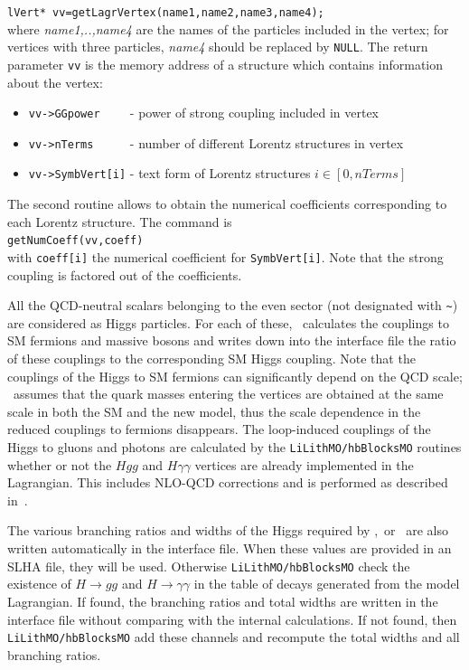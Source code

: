 \documentclass[12pt,a4paper]{article}
\begin{document}
\verb|lVert* vv=getLagrVertex(name1,name2,name3,name4);|\\

\noindent
where {\it name1,..,name4 } are the names of the particles included  in the vertex; for vertices with three particles, {\it name4} should be replaced by
{\tt NULL}.  The return parameter {\tt vv} is the memory address of a structure which contains information about the vertex:
\begin{itemize}
\item \verb|vv->GGpower    | - power of strong coupling included in vertex
\item \verb|vv->nTerms     | - number of different  Lorentz structures in vertex
\item \verb|vv->SymbVert[i]| - text form of Lorentz structures $i\in [0,nTerms]$  
\end{itemize}
The second routine allows to obtain the numerical coefficients corresponding to  each  Lorentz structure. The command is\\

\verb|getNumCoeff(vv,coeff)| \\

\noindent
with {\tt coeff[i]} the numerical coefficient for {\tt SymbVert[i]}. Note that the strong coupling is factored out of the coefficients. 

 
All the QCD-neutral scalars belonging to the even sector (not designated with \verb|~|)  are considered as  Higgs particles. For each of these, \micro\ calculates  the couplings to  SM fermions and massive  bosons and  writes down into the interface file the ratio of these couplings to the  corresponding  SM Higgs coupling. Note that the  couplings of the Higgs to   SM  fermions can significantly depend on the QCD scale; \micro\ assumes that the quark masses entering the vertices are obtained at the same scale in both  the
SM and  the new model, thus the scale dependence in the  reduced couplings to fermions disappears. 
The loop-induced  couplings of the Higgs to  gluons and photons are calculated by the {\tt LiLithMO/hbBlocksMO}  routines whether or not the $Hgg$ and $H\gamma\gamma$ vertices are already implemented in the Lagrangian. This includes NLO-QCD corrections and is performed as described in~\cite{Belanger:2013oya,Djouadi:1997yw}.

The various branching ratios and widths of the Higgs required by   \HB,\HS\ or  \lilith\ are also written automatically in the interface file. When these 
values  are provided in an SLHA file, they will be used. Otherwise {\tt LiLithMO/hbBlocksMO}  check  the existence
of $H\rightarrow gg$  and $H\rightarrow \gamma\gamma$  in the table of decays generated from the model Lagrangian. If found, the branching ratios and total widths are written in the  interface file without comparing  with the internal calculations. If not found, then {\tt LiLithMO/hbBlocksMO} add these channels and  recompute the total widths and all branching ratios.
\end{document}
